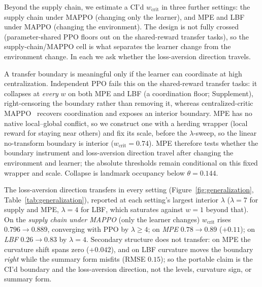 \documentclass[letterpaper]{article} %
\theoremstyle{plain}
\newcommand{\wcrit}{w_{\mathrm{crit}}}
\begin{document}
Beyond the supply chain, we estimate a CI'd $\wcrit$ in three further settings: the supply chain under
MAPPO (changing only the learner), and MPE and LBF under MAPPO (changing the environment). The design
is not fully crossed (parameter-shared PPO floors out on the shared-reward transfer tasks), so the
supply-chain/MAPPO cell is what separates the learner change from the environment change. In each we
ask whether the loss-aversion direction travels.

A transfer boundary is meaningful only if the learner can coordinate at high centralization.
Independent PPO fails this on the shared-reward transfer tasks: it collapses at \emph{every} $w$ on
both MPE and LBF (a coordination floor; Supplement), right-censoring the boundary rather than removing
it, whereas centralized-critic MAPPO~\citep{yu2022surprising} recovers coordination and exposes an
interior boundary. MPE has no native local--global conflict, so we construct one with a herding
wrapper (local reward for staying near others) and fix its scale, before the $\lambda$-sweep, so the
linear no-transform boundary is interior ($\wcrit=0.74$). MPE therefore tests whether the boundary
instrument and loss-aversion direction travel after changing the environment and learner; the absolute
thresholds remain conditional on this fixed wrapper and scale. Collapse is landmark occupancy below
$\theta=0.144$.

The loss-aversion direction transfers in every setting
(Figure~\ref{fig:generalization}, Table~\ref{tab:generalization}), reported at each setting's largest
interior $\lambda$ ($\lambda{=}7$ for supply and MPE, $\lambda{=}4$ for LBF, which saturates against
$w{=}1$ beyond that). On the \emph{supply chain under MAPPO} (only the
learner changes) $\wcrit$ rises $0.796\to0.889$, converging with PPO by $\lambda\!\geq\!4$; on
\emph{MPE} $0.78\to0.89$ ($+0.11$); on \emph{LBF} $0.26\to0.83$ by
$\lambda{=}4$. Secondary structure does
not transfer: on MPE the curvature shift spans zero ($+0.042$), and on LBF curvature moves the
boundary \emph{right} while the summary form misfits (RMSE $0.15$); so the portable claim is the CI'd
boundary and the loss-aversion direction, not the levels, curvature sign, or summary form.
\end{document}
